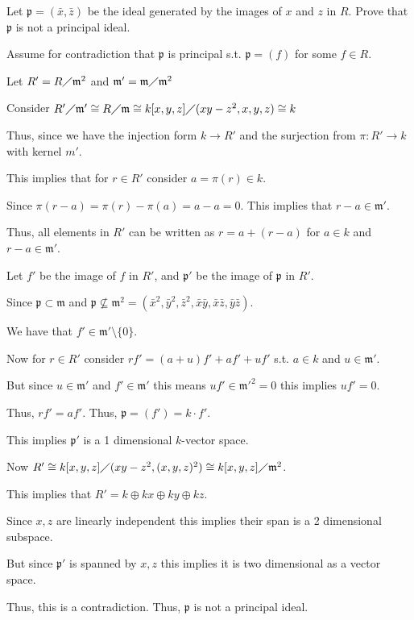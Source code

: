 \documentclass[12pt, letterpaper]{article}
\newcommand{\p}{\mathfrak{p}}
\newcommand{\mf}[1]{\mathfrak{#1}}
\begin{document}
\begin{subproblem}{}
    Let $\p = (\bar{x}, \bar{z})$ be the ideal generated by the images of $x$ and $z$ in $R$. Prove that $\p$ is
not a principal ideal.
\end{subproblem}
\begin{problemproof}
    Assume for contradiction that $\p$ is principal s.t. $\p=(f)$ for some $f \in R$.

    Let $R'=R \diagup \mf{m}^2$ and $\mf{m}' = \mf{m} \diagup \mf{m}^2$

    Consider $R' \diagup \mf{m}' \cong R \diagup \mf{m} \cong k[x,y,z] \diagup (xy-z^2,x,y,z) \cong k$

    Thus, since we have the injection form $k \to R'$ and the surjection from $\pi: R' \to k$ with kernel $m'$.

    This implies that for $r \in R'$ consider $a= \pi(r) \in k$.

    Since $\pi(r-a)=\pi(r)-\pi(a)=a-a=0$. This implies that $r-a \in \mf{m}'$.

    Thus, all elements in $R'$ can be written as $r=a+(r-a)$ for $a \in k$ and $r-a \in \mf{m}'$.

    Let $f'$ be the image of $f$ in $R'$, and $\p'$ be the image of $\p$ in $R'$.

    Since $\p \subset \mf{m}$ and $\p \nsubseteq \mf{m}^2=(\bar{x}^2,\bar{y}^2,\bar{z}^2,\bar{x}\bar{y},\bar{x}\bar{z},\bar{y}\bar{z})$.

    We have that $f' \in \mf{m}' \setminus \{0\}$.

    Now for $r \in R'$ consider $rf' = (a+u)f'+af'+uf'$ s.t. $a \in k$ and $u \in \mf{m}'$.

    But since $u \in \mf{m}'$ and $f' \in \mf{m}'$ this means $uf' \in {\mf{m}'}^2=0$ this implies $uf'=0$.

    Thus, $rf'=af'$. Thus, $\p=(f')=k \cdot f'$.

    This implies $\p'$ is a 1 dimensional $k$-vector space.

    Now $R' \cong k[x,y,z] \diagup (xy-z^2,(x,y,z)^2) \cong k[x,y,z] \diagup \mf{m}^2$.

    This implies that $R'=k \oplus kx \oplus ky \oplus kz$.

    Since $x,z$ are linearly independent this implies their span is a 2 dimensional subspace.

    But since $\p'$ is spanned by $x,z$ this implies it is two dimensional as a vector space.

    Thus, this is a contradiction. Thus, $\p$ is not a principal ideal.
\end{problemproof}
\end{document}
